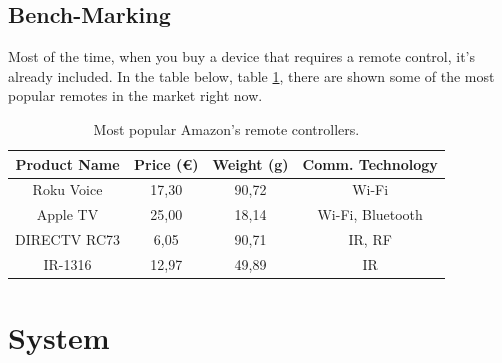 \documentclass[12pt, letterpaper]{report}
\begin{document}
%
%
%


\subsection{Bench-Marking}
Most of the time, when you buy a device that requires a remote control, it's already included. In the table below, table \ref{table:popular_remotes}, there are shown some of the most popular remotes in the market right now.

\begin{table}[h]
    \centering
    \begin{tabular}{||c c c c||} 
    \hline
    Product Name & Price (€) & Weight (g) & Comm. Technology\\
    \hline\hline
    Roku Voice \cite{RokuVoiceRemote} & 17,30 & 90,72 & Wi-Fi\\ 
    Apple TV \cite{AppleTVRemote} & 25,00 & 18,14 & Wi-Fi, Bluetooth \\
    DIRECTV RC73 \cite{DIRECTV_RC73} & 6,05 & 90,71 & IR, RF \\
    IR-1316 \cite{UniversalRemoteControl_Samsung} & 12,97 & 49,89 & IR \\
    \hline
\end{tabular}
				
\caption{Most popular Amazon's remote controllers. }
\label{table:popular_remotes}
\end{table}
		
\section{System}
\end{document}
